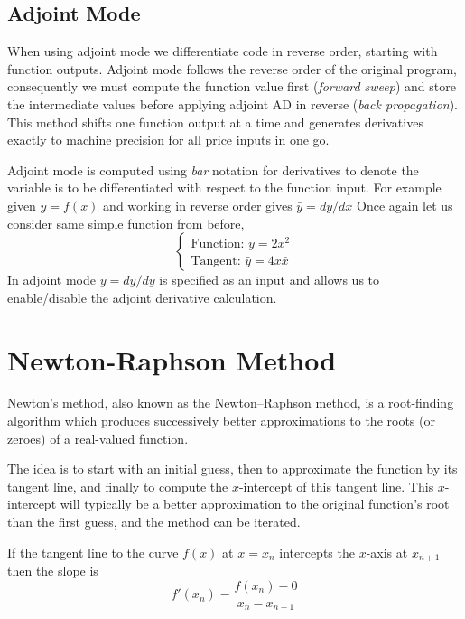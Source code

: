 \documentclass[12pt,a4paper]{book}
\begin{document}
\subsection{Adjoint Mode}
When using adjoint mode we differentiate code in reverse order, starting with function outputs. 
Adjoint mode follows the reverse order of the original program, consequently we must compute the function value first (\emph{forward sweep}) and store the intermediate values before applying adjoint AD in reverse (\emph{back propagation}). This method shifts one function output at a time and generates derivatives exactly to machine precision for all price inputs in one go.

Adjoint mode is computed using \emph{bar} notation for derivatives to denote the variable is to be differentiated with respect to the function input. For example given $y = f(x)$ and working in reverse order gives $\bar{y} = dy/dx$
Once again let us consider same simple function from before,
\begin{equation}
\begin{cases}
\text{Function: } y = 2x^2\\
\text{Tangent: } \bar{y} = 4x\bar{x}
\end{cases}
\end{equation}
In adjoint mode $\bar{y} = dy/dy$ is specified as an input and allows us to enable/disable the adjoint derivative calculation. 


\section{Newton-Raphson Method}
Newton's method, also known as the Newton–Raphson method, is a root-finding algorithm which produces successively better approximations to the roots (or zeroes) of a real-valued function. %

The idea is to start with an initial guess, then to approximate the function by its tangent line, and finally to compute the $x$-intercept of this tangent line. This $x$-intercept will typically be a better approximation to the original function's root than the first guess, and the method can be iterated.

If the tangent line to the curve $f(x)$ at $x = x_n$ intercepts the $x$-axis at $x_{n+1}$ then the slope is
\begin{equation}
	f'(x_n)=\dfrac {f(x_{n})-0}{x_{n}-x_{n+1}}
\end{equation}
\end{document}
